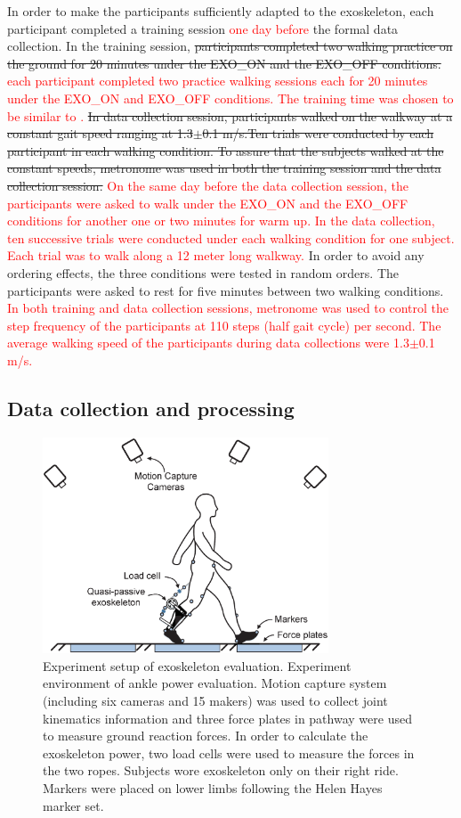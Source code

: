 \documentclass[twocolumn,cleanfoot,10pt]{asme2ej}
\begin{document}
In order to make the participants sufficiently adapted to the exoskeleton, each participant completed a training session \textcolor{red}{one day before} the formal data collection.
In the training session, \sout{participants completed two walking practice on the ground for 20 minutes under the EXO\_ON and the EXO\_OFF conditions.} \textcolor{red}{each participant completed two practice walking sessions each for 20 minutes under the EXO\_ON and EXO\_OFF conditions.
The training time was chosen to be similar to \cite{RN5}.}
\sout{In data collection session, participants walked on the walkway at a constant gait speed ranging at 1.3$\pm$0.1 m/s.Ten trials were conducted by each participant in each walking condition. To assure that the subjects walked at the constant speeds, metronome was used in both the training session and the data collection session.}
\textcolor{red}{On the same day before the data collection session, the participants were asked to walk under the EXO\_ON and the EXO\_OFF conditions for another one or two minutes for warm up.
In the data collection, ten successive trials were conducted under each walking condition for one subject.
Each trial was to walk along a 12 meter long walkway.}
In order to avoid any ordering effects, the three conditions were tested in random orders.
The participants were asked to rest for five minutes between two walking conditions.
\textcolor{red}{In both training and data collection sessions, metronome was used to control the step frequency of the participants at 110 steps (half gait cycle) per second.
The average walking speed of the participants during data collections were 1.3$\pm$0.1 m/s.}

\subsection{Data collection and processing}

\begin{figure}[bt]
	\centering
	\includegraphics[width=8.5cm]{environment.eps}
	\caption{Experiment setup of exoskeleton evaluation.
	Experiment environment of ankle power evaluation.
	Motion capture system (including six  cameras and 15 makers) was used to collect joint kinematics information and three force plates in pathway were used to measure ground reaction forces.
	In order to calculate the exoskeleton power, two load cells were used to measure the forces in the two ropes.
	Subjects wore exoskeleton only on their right ride.
	Markers were placed on lower limbs following the Helen Hayes marker set.}
	\label{fig:Environment}
\end{figure}
\end{document}
